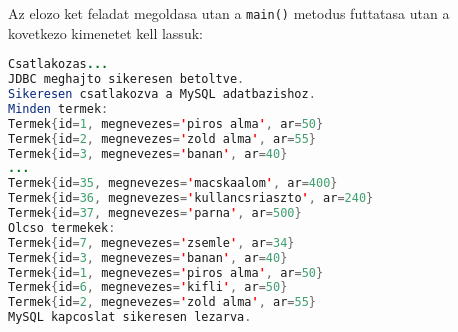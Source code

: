 \documentclass{article}
\let\l\lstinline
\begin{document}
Az elozo ket feladat megoldasa utan a \l{main()} metodus futtatasa utan a kovetkezo kimenetet kell lassuk:

\begin{lstlisting}[language=Java, caption=Main.main() kimenet]
Csatlakozas...
JDBC meghajto sikeresen betoltve.
Sikeresen csatlakozva a MySQL adatbazishoz.
Minden termek:
Termek{id=1, megnevezes='piros alma', ar=50}
Termek{id=2, megnevezes='zold alma', ar=55}
Termek{id=3, megnevezes='banan', ar=40}
...
Termek{id=35, megnevezes='macskaalom', ar=400}
Termek{id=36, megnevezes='kullancsriaszto', ar=240}
Termek{id=37, megnevezes='parna', ar=500}
Olcso termekek:
Termek{id=7, megnevezes='zsemle', ar=34}
Termek{id=3, megnevezes='banan', ar=40}
Termek{id=1, megnevezes='piros alma', ar=50}
Termek{id=6, megnevezes='kifli', ar=50}
Termek{id=2, megnevezes='zold alma', ar=55}
MySQL kapcoslat sikeresen lezarva.
\end{lstlisting}
\end{document}
